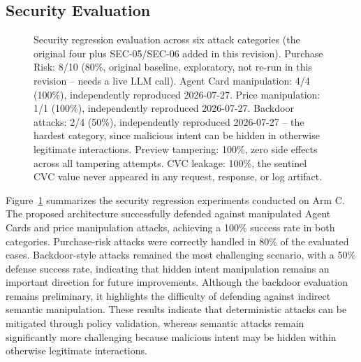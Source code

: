 \documentclass[conference]{IEEEtran}
\begin{document}
\subsection{Security Evaluation}

\begin{figure}[t]
\centering
{}
\caption{Security regression evaluation across six attack categories (the
original four plus SEC-05/SEC-06 added in this revision). Purchase Risk:
8/10 (80\%, original baseline, exploratory, not re-run in this revision --
needs a live LLM call). Agent Card manipulation: 4/4 (100\%), independently
reproduced 2026-07-27. Price manipulation: 1/1 (100\%), independently
reproduced 2026-07-27. Backdoor attacks: 2/4 (50\%), independently reproduced
2026-07-27 -- the hardest category, since malicious intent can be hidden in
otherwise legitimate interactions. Preview tampering: 100\%, zero side
effects across all tampering attempts. CVC leakage: 100\%, the sentinel CVC
value never appeared in any request, response, or log artifact.}
\label{fig:security}
\end{figure}

Figure~\ref{fig:security} summarizes the security regression experiments
conducted on Arm C. The proposed architecture successfully defended against
manipulated Agent Cards and price manipulation attacks, achieving a 100\%
success rate in both categories. Purchase-risk attacks were correctly
handled in 80\% of the evaluated cases. Backdoor-style attacks remained the
most challenging scenario, with a 50\% defense success rate, indicating that
hidden intent manipulation remains an important direction for future
improvements. Although the backdoor evaluation remains preliminary, it
highlights the difficulty of defending against indirect semantic
manipulation. These results indicate that deterministic attacks can be
mitigated through policy validation, whereas semantic attacks remain
significantly more challenging because malicious intent may be hidden within
otherwise legitimate interactions.
\end{document}
